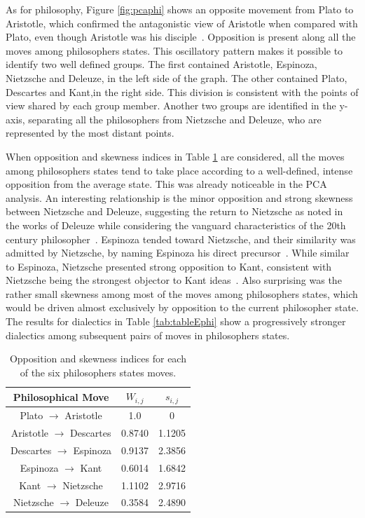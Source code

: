 \documentclass[
 aip,
 jmp,
 amsmath,amssymb,
 reprint,
]{revtex4-1}
\begin{document}
As for philosophy, Figure \ref{fig:pcaphi} shows an opposite movement
from Plato to Aristotle, which confirmed the antagonistic view of
Aristotle when compared with Plato, even though Aristotle was his
disciple~\cite{Russel}. Opposition is present along all the moves
among philosophers states. This oscillatory pattern makes it possible
to identify two well defined groups. The first contained Aristotle,
Espinoza, Nietzsche and Deleuze, in the left side of the graph. The
other contained Plato, Descartes and Kant,in the right side.  This
division is consistent with the points of view shared by each group
member. Another two groups are identified in the y-axis, separating
all the philosophers from Nietzsche and Deleuze, who are represented
by the most distant points.

When opposition and skewness indices in Table \ref{tab:tableOIphi} are
considered, all the moves among philosophers states tend to take place
according to a well-defined, intense opposition from the average
state. This was already noticeable in the PCA analysis. An interesting
relationship is the minor opposition and strong skewness between
Nietzsche and Deleuze, suggesting the return to Nietzsche as noted in
the works of Deleuze while considering the vanguard characteristics of
the 20th century philosopher~\cite{Deleuze2}. Espinoza tended toward
Nietzsche, and their similarity was admitted by Nietzsche, by naming
Espinoza his direct precursor~\cite{Russel}. While similar to
Espinoza, Nietzsche presented strong opposition to Kant, consistent
with Nietzsche being the strongest objector to Kant
ideas~\cite{Russel}. Also surprising was the rather small skewness
among most of the moves among philosophers states, which would be
driven almost exclusively by opposition to the current philosopher
state.  The results for dialectics in Table \ref{tab:tableEphi} show a
progressively stronger dialectics among subsequent pairs of moves in
philosophers states.

\begin{table}
  \caption{\label{tab:tableOIphi}Opposition and skewness indices for
    each of the six philosophers states moves.}
  \begin{tabular}{|c||c|c|}
    \hline
    Philosophical Move & $W_{i,j}$ & $s_{i,j}$ \\
    \hline \hline
    Plato $\rightarrow$ Aristotle     & 1.0    & 0 \\
    Aristotle $\rightarrow$ Descartes & 0.8740 & 1.1205 \\
    Descartes $\rightarrow$ Espinoza  & 0.9137 & 2.3856 \\
    Espinoza $\rightarrow$ Kant       & 0.6014 & 1.6842 \\
    Kant $\rightarrow$ Nietzsche      & 1.1102 & 2.9716 \\
    Nietzsche $\rightarrow$ Deleuze   & 0.3584 & 2.4890 \\
    \hline
  \end{tabular}
\end{table}
\end{document}
